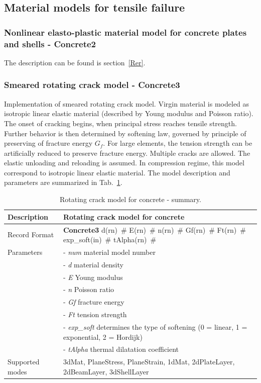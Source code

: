 \documentclass[a4paper]{article}
\newcommand{\descitem}[1]{{\noindent \bf #1}}
\newcommand{\elemparam}[2]{{{#1\tiny (#2)}~\#}}
\newcommand{\param}[1]{{\it #1}}
\newenvironment{mmt}{\begin{tabular}{|l|p{9cm}|}}{\end{tabular}\\}
\newenvironment{mmt}{\begin{tabular}{|l|l|}}{\end{tabular}\\}
\begin{document}
\subsection{Material models for tensile failure}
\subsubsection{Nonlinear elasto-plastic material model for concrete
plates and shells - Concrete2}
The description can be found is section~\ref{Rer}.



\subsubsection{Smeared rotating crack model - Concrete3}
\label{rcm}
Implementation of smeared rotating crack model.
Virgin material is modeled as isotropic linear elastic material
(described by Young modulus and Poisson
ratio). The onset of cracking begins, when principal stress reaches
tensile strength.
Further behavior is then determined by softening law,
governed by principle of preserving of fracture
energy $G_f$. For large elements, the tension strength can be
artificially reduced
to preserve fracture energy. Multiple cracks are allowed.
The elastic unloading and reloading is assumed.
In compression regime, this model correspond to isotropic linear elastic material.
The model description and parameters are summarized
in Tab.~\ref{rcm_table}.

\begin{table}[!htb]
\begin{mmt}
\hline
Description & Rotating crack model for concrete\\
\hline
Record Format & \descitem{Concrete3} \elemparam{d}{rn} \elemparam{E}{rn}
\elemparam{n}{rn} \elemparam{Gf}{rn} \elemparam{Ft}{rn} \elemparam{exp\_soft}{in} \elemparam{tAlpha}{rn} \\
Parameters &- \param{num} material model number\\
&- \param{d} material density\\
&- \param{E} Young modulus\\
&- \param{n} Poisson ratio\\
&- \param{Gf} fracture energy\\
&- \param{Ft} tension strength\\
&- \param{exp\_soft} determines the type of softening (0 =
linear, 1 = exponential, 2 = Hordijk)\\
&- \param{tAlpha} thermal dilatation coefficient\\
Supported modes& 3dMat, PlaneStress, PlaneStrain, 1dMat,
2dPlateLayer, 2dBeamLayer, 3dShellLayer\\
\hline
\end{mmt}
\caption{Rotating crack model for concrete - summary.}
\label{rcm_table}
\end{table}
\end{document}
